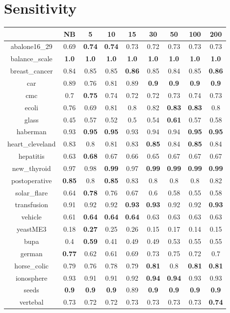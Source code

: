 \documentclass{article}%
\begin{document}
%
\section*{Sensitivity}%
\begin{tabular}{c|cccccccc}%
\hline%
&NB&5&10&15&30&50&100&200\\%
\hline%
abalone16\_29&0.69&\textbf{0.74}&\textbf{0.74}&0.73&0.72&0.73&0.73&0.73\\%
\hline%
balance\_scale&\textbf{1.0}&\textbf{1.0}&\textbf{1.0}&\textbf{1.0}&\textbf{1.0}&\textbf{1.0}&\textbf{1.0}&\textbf{1.0}\\%
\hline%
breast\_cancer&0.84&0.85&0.85&\textbf{0.86}&0.85&0.84&0.85&\textbf{0.86}\\%
\hline%
car&0.89&0.76&0.81&0.89&\textbf{0.9}&\textbf{0.9}&\textbf{0.9}&\textbf{0.9}\\%
\hline%
cmc&0.7&\textbf{0.75}&0.74&0.72&0.72&0.73&0.74&0.73\\%
\hline%
ecoli&0.76&0.69&0.81&0.8&0.82&\textbf{0.83}&\textbf{0.83}&0.8\\%
\hline%
glass&0.45&0.57&0.52&0.5&0.54&\textbf{0.61}&0.57&0.58\\%
\hline%
haberman&0.93&\textbf{0.95}&\textbf{0.95}&0.93&0.94&0.94&\textbf{0.95}&\textbf{0.95}\\%
\hline%
heart\_cleveland&0.83&0.8&0.81&0.83&\textbf{0.85}&0.84&\textbf{0.85}&0.84\\%
\hline%
hepatitis&0.63&\textbf{0.68}&0.67&0.66&0.65&0.67&0.67&0.67\\%
\hline%
new\_thyroid&0.97&0.98&\textbf{0.99}&0.97&\textbf{0.99}&\textbf{0.99}&\textbf{0.99}&\textbf{0.99}\\%
\hline%
postoperative&\textbf{0.85}&0.8&\textbf{0.85}&0.83&0.8&0.8&0.8&0.82\\%
\hline%
solar\_flare&0.64&\textbf{0.78}&0.76&0.67&0.6&0.58&0.55&0.58\\%
\hline%
transfusion&0.91&0.92&0.92&\textbf{0.93}&\textbf{0.93}&0.92&0.92&\textbf{0.93}\\%
\hline%
vehicle&0.61&\textbf{0.64}&\textbf{0.64}&\textbf{0.64}&0.63&0.63&0.63&0.63\\%
\hline%
yeastME3&0.18&\textbf{0.27}&0.25&0.26&0.15&0.17&0.14&0.15\\%
\hline%
bupa&0.4&\textbf{0.59}&0.41&0.49&0.49&0.53&0.55&0.55\\%
\hline%
german&\textbf{0.77}&0.62&0.61&0.69&0.73&0.75&0.72&0.7\\%
\hline%
horse\_colic&0.79&0.76&0.78&0.79&\textbf{0.81}&0.8&\textbf{0.81}&\textbf{0.81}\\%
\hline%
ionosphere&0.93&0.91&0.91&0.92&\textbf{0.94}&\textbf{0.94}&0.93&0.93\\%
\hline%
seeds&\textbf{0.9}&\textbf{0.9}&\textbf{0.9}&0.89&\textbf{0.9}&\textbf{0.9}&\textbf{0.9}&\textbf{0.9}\\%
\hline%
vertebal&0.73&0.72&0.72&0.73&0.73&0.73&0.73&\textbf{0.74}\\%
\hline%
\end{tabular}
\end{document}
